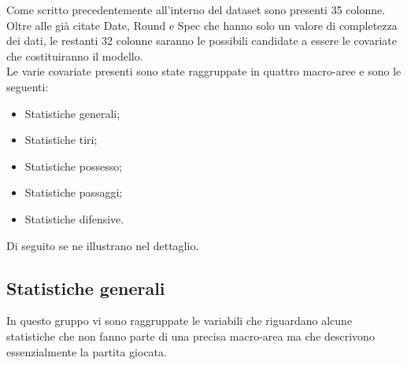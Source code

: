 Come scritto precedentemente all'interno del dataset sono presenti 35 colonne. Oltre alle già citate \textsf{Date}, \textsf{Round} e \textsf{Spec} che hanno solo un valore di completezza dei dati, le restanti 32 colonne saranno le possibili candidate a essere le covariate che costituiranno il modello.\\
Le varie covariate presenti sono state raggruppate in quattro macro-aree e sono le seguenti:
\begin{itemize}
	\item Statistiche generali;
	\item Statistiche tiri;
	\item Statistiche possesso;
	\item Statistiche passaggi;
	\item Statistiche difensive.
\end{itemize}

Di seguito se ne illustrano nel dettaglio.

\subsection{Statistiche generali}
In questo gruppo vi sono raggruppate le variabili che riguardano alcune statistiche che non fanno parte di una precisa macro-area ma che descrivono essenzialmente la partita giocata. 

